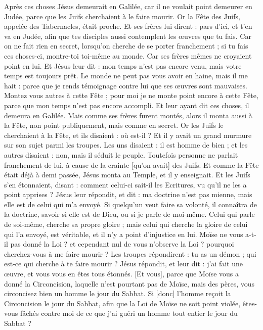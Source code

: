 \begin{multicols}{2}
\VerseOne{}Après ces choses Jésus demeurait en Galilée, car il ne voulait point demeurer en Judée, parce que les Juifs cherchaient à le faire mourir.
Or la Fête des Juifs, appelée des Tabernacles, était proche.
Et ses frères lui dirent : pars d'ici, et t'en va en Judée, afin que tes disciples aussi contemplent les œuvres que tu fais.
Car on ne fait rien en secret, lorsqu'on cherche de se porter franchement ; si tu fais ces choses-ci, montre-toi toi-même au monde.
Car ses frères mêmes ne croyaient point en lui.
Et Jésus leur dit : mon temps n'est pas encore venu, mais votre temps est toujours prêt.
Le monde ne peut pas vous avoir en haine, mais il me hait : parce que je rends témoignage contre lui que ses œuvres sont mauvaises.
Montez vous autres à cette Fête ; pour moi je ne monte point encore à cette Fête, parce que mon temps n'est pas encore accompli.
Et leur ayant dit ces choses, il demeura en Galilée.
Mais comme ses frères furent montés, alors il monta aussi à la Fête, non point publiquement, mais comme en secret.
Or les Juifs le cherchaient à la Fête, et ils disaient : où est-il ?
Et il y avait un grand murmure sur son sujet parmi les troupes. Les uns disaient : il est homme de bien ; et les autres disaient : non, mais il séduit le peuple.
Toutefois personne ne parlait franchement de lui, à cause de la crainte [qu'on avait] des Juifs.
Et comme la Fête était déjà à demi passée, Jésus monta au Temple, et il y enseignait.
Et les Juifs s'en étonnaient, disant : comment celui-ci sait-il les Ecritures, vu qu'il ne les a point apprises ?
Jésus leur répondit, et dit : ma doctrine n'est pas mienne, mais elle est de celui qui m'a envoyé.
Si quelqu'un veut faire sa volonté, il connaîtra de la doctrine, savoir si elle est de Dieu, ou si je parle de moi-même.
Celui qui parle de soi-même, cherche sa propre gloire ; mais celui qui cherche la gloire de celui qui l'a envoyé, est véritable, et il n'y a point d'injustice en lui.
Moïse ne vous a-t-il pas donné la Loi ? et cependant nul de vous n'observe la Loi ? pourquoi cherchez-vous à me faire mourir ?
Les troupes répondirent : tu as un démon ; qui est-ce qui cherche à te faire mourir ?
Jésus répondit, et leur dit : j'ai fait une œuvre, et vous vous en êtes tous étonnés.
[Et vous], parce que Moïse vous a donné la Circoncision, laquelle n'est pourtant pas de Moïse, mais des pères, vous circoncisez bien un homme le jour du Sabbat.
Si [donc] l'homme reçoit la Circoncision le jour du Sabbat, afin que la Loi de Moïse ne soit point violée, êtes-vous fâchés contre moi de ce que j'ai guéri un homme tout entier le jour du Sabbat ?

\end{multicols}
